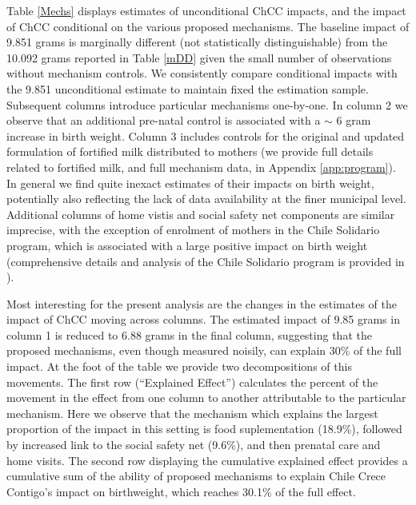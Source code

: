 \documentclass[12pt]{article}
\begin{document}
\begin{spacing}{1.4}
Table \ref{Mechs} displays estimates of unconditional ChCC impacts, and
the impact of ChCC conditional on the various proposed mechanisms.  The
baseline impact of 9.851 grams is marginally different (not statistically
distinguishable) from the 10.092 grams reported in Table \ref{mDD} given
the small number of observations without mechanism controls.  We
consistently compare conditional impacts with the 9.851 unconditional
estimate to maintain fixed the estimation sample.  Subsequent columns
introduce particular mechanisms one-by-one.  In column 2 we observe that
an additional pre-natal control is associated with a $\sim$ 6 gram increase
in birth weight.  Column 3 includes controls for the original and updated
formulation of fortified milk distributed to mothers (we provide full
details related to fortified milk, and full mechanism data, in Appendix
\ref{app:program}). In general we find quite inexact estimates of their
impacts on birth weight, potentially also reflecting the lack of data
availability at the finer municipal level.  Additional columns of home
vistis and social safety net components are similar imprecise, with the 
exception of enrolment of mothers in the Chile Solidario program, which
is associated with a large positive impact on birth weight (comprehensive
details and analysis of the Chile Solidario program is provided in
\citet{Carneiroetal2014}).

Most interesting for the present analysis are the changes in the estimates
of the impact of ChCC moving across columns.  The estimated impact of
9.85 grams in column 1 is reduced to 6.88 grams in the final column,
suggesting that the proposed mechanisms, even though measured noisily,
can explain 30\% of the full impact.  At the foot of the table we provide
two decompositions of this movements.  The first row (``Explained Effect'')
calculates the percent of the movement in the effect from one column to
another attributable to the particular mechanism.  Here we observe that
the mechanism which explains the largest proportion of the impact in this
setting is food suplementation (18.9\%), followed by increased link to the
social safety net (9.6\%), and then prenatal care and home visits.
The second row displaying the cumulative explained effect provides a
cumulative sum of the ability of proposed mechanisms to explain Chile
Crece Contigo's impact on birthweight, which reaches 30.1\% of the full
effect.




\end{spacing}
\end{document}
